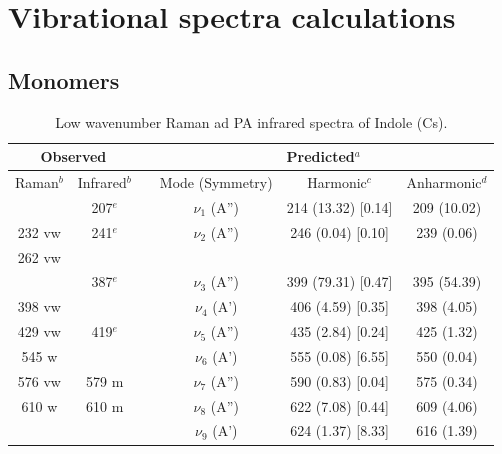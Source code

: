 \chapter[Vibrational spectra calculations]{Vibrational spectra calculations}
\minitoc
\restoregeometry

\newpage
	
	\section{Monomers}
	
	\begin{table}[H]
		\caption{Low wavenumber Raman ad PA infrared spectra of Indole (Cs).}
		\begin{center}
		\begin{threeparttable}
		\begin{tabular}{c c c c c c}
			\hline
			\multicolumn{ 2}{c}{Observed} & \multicolumn{1}{c}{} & \multicolumn{ 3}{c}{Predicted$^{a}$} \\ \hline
			Raman$^{b}$ & \multicolumn{1}{c}{Infrared$^{b}$} &  & \multicolumn{1}{c}{Mode (Symmetry)} & \multicolumn{1}{c}{Harmonic$^{c}$} & Anharmonic$^{d}$ \\ \hline
			& 207$^{e}$ &  & $\nu_{1}$ (A”) & 214 (13.32) [0.14] & 209 (10.02) \\ 
			232 vw & 241$^{e}$ &  &$\nu_{2}$ (A”) & 246 (0.04) [0.10] & 239 (0.06) \\ 
			262 vw &  &  &  &  &  \\ 
			& 387$^{e}$ &  & $\nu_{3}$ (A”) & 399 (79.31) [0.47] & 395 (54.39) \\ 
			398 vw &  &  & $\nu_{4}$ (A’) & 406 (4.59) [0.35] & 398 (4.05) \\ 
			429 vw & 419$^{e}$&  & $\nu_{5}$ (A”) & 435 (2.84) [0.24] & 425 (1.32) \\ 
			545 w &  &  & $\nu_{6}$ (A’) & 555 (0.08) [6.55] & 550 (0.04) \\ 
			576 vw & \multicolumn{1}{c}{579 m} &  & $\nu_{7}$ (A”) & 590 (0.83) [0.04] & 575 (0.34) \\ 
			610 w & \multicolumn{1}{c}{610 m} &  & $\nu_{8}$ (A”)  & 622 (7.08) [0.44] & 609 (4.06) 
			\\ 
			\multicolumn{1}{l}{} &  &  & $\nu_{9}$ (A’)
			& 624 (1.37) [8.33]
			& 616 (1.39)
			\\ \hline
		\end{tabular}
		

\end{threeparttable}
\end{center}
\end{table}
